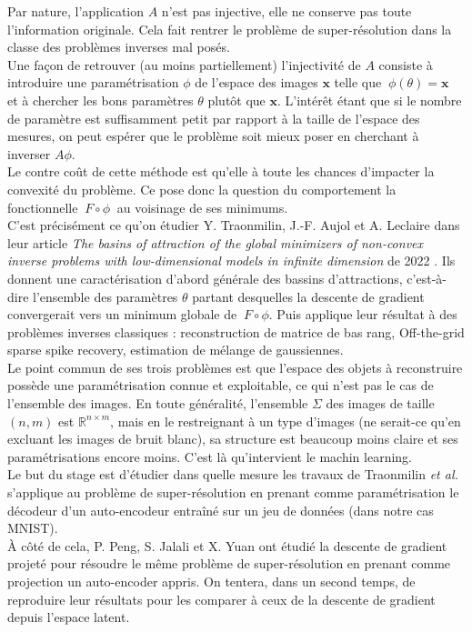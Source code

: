 \documentclass[hidelinks, french]{article} %
\newcommand{\R}{\mathbb{R}}
\newcommand{\etal}{\textit{et al. }}
\renewcommand{\bf}[1]{\boldsymbol{#1}}
\theoremstyle{enonce}
\theoremstyle{special}
\theoremstyle{rq}
\theoremstyle{exo}
\theoremstyle{demo}
\begin{document}
Par nature, l'application $A$ n'est pas injective, elle ne conserve pas toute l'information originale. Cela fait rentrer le problème de super-résolution dans la classe des problèmes inverses mal posés.
\\

Une façon de retrouver (au moins partiellement) l'injectivité de $A$ consiste à introduire une paramétrisation $\phi$ de l'espace des images $\bf{x}$ telle que $\ \phi(\theta)=\bf{x}\ $ et à chercher les bons paramètres $\theta$ plutôt que $\bf{x}$. L'intérêt étant que si le nombre de paramètre est suffisamment petit par rapport à la taille de l'espace des mesures, on peut espérer que le problème soit mieux poser en cherchant à inverser $A\phi$.
\\
Le contre coût de cette méthode est qu'elle à toute les chances  d'impacter la convexité du problème. Ce pose donc la question du comportement la fonctionnelle $\ F\circ\phi\ $ au voisinage de ses minimums. 
\\
C'est précisément ce qu'on étudier Y. Traonmilin, J.-F. Aujol et A. Leclaire  dans leur article \emph{The basins of attraction of the global minimizers of non-convex inverse problems with low-dimensional models in infinite dimension} de 2022 \cite{traonmilin_basins_2022}. Ils donnent une caractérisation d'abord générale des bassins d'attractions, c'est-à-dire l'ensemble des paramètres $\theta$ partant desquelles la descente de gradient convergerait vers un minimum globale de $\ F\circ\phi$. Puis applique leur résultat à des problèmes inverses classiques : reconstruction de matrice de bas rang, Off-the-grid sparse spike recovery, estimation de mélange de gaussiennes.
\\

Le point commun de ses trois problèmes est que l'espace des objets à reconstruire possède une paramétrisation connue et exploitable, ce qui n'est pas le cas de l'ensemble des images. En toute généralité, l'ensemble $\Sigma$ des images de taille $(n,m)$ est $\R^{n\times m}$, mais en le restreignant à un type d'images (ne serait-ce qu'en excluant les images de bruit blanc), sa structure est beaucoup moins claire et ses paramétrisations encore moins. C'est là qu'intervient le machin learning.
\\

Le but du stage est d'étudier dans quelle mesure les travaux de Traonmilin \etal s'applique au problème de super-résolution en prenant comme paramétrisation le décodeur d'un auto-encodeur entraîné sur un jeu de données (dans notre cas MNIST). 
\\
\`A côté de cela, P. Peng, S. Jalali et X. Yuan ont étudié la descente de gradient projeté pour résoudre le même problème de super-résolution en prenant comme projection un auto-encoder appris. On tentera, dans un second temps, de reproduire leur résultats pour les comparer à ceux de la descente de gradient depuis l'espace latent.
\\
\end{document}
